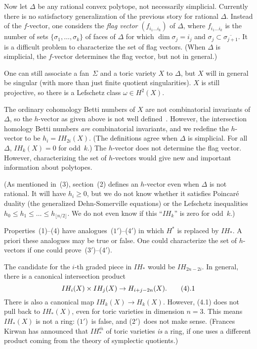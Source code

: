 Now let $\Delta$ be any rational convex polytope, not necessarily
simplicial.  Currently there is no satisfactory generalization of the
previous story for rational $\Delta$.  Instead of the $f$-vector, one
considers the {\sl flag vector\/} $(f_{i_1 \dots i_k})$ of $\Delta$,
where $f_{i_1 \dots i_k}$ is the number of sets $\{\sigma_1, \dots,
\sigma_k\}$ of faces of $\Delta$ for which $\dim \sigma_{j} = i_j$ and
$\sigma_j \subset \overline{\sigma_{j+1}}$.  It is a difficult problem
to characterize the set of flag vectors.  (When $\Delta$ is
simplicial, the $f$-vector determines the flag vector, but not in
general.)

One can still associate a fan~$\Sigma$ and a toric variety $X$ to
$\Delta$, but $X$ will in general be singular (with more than just
finite quotient singularities).  $X$ is still projective, so there is
a Lefschetz class $\omega\in H^2(X)$.

The ordinary cohomology Betti numbers of $X$ are not combinatorial
invariants of $\Delta$, so the $h$-vector as given above is not well
defined~\cite{M0}.  However, the intersection homology Betti numbers
{\sl are\/} combinatorial invariants, and we redefine the $h$-vector
to be $h_i = IH_{2i}(X)$.  (The definitions agree when $\Delta$ is
simplicial.  For all~$\Delta$, $IH_k(X) = 0$ for odd~$k$.)  The
$h$-vector does not determine the flag vector.  However,
characterizing the set of $h$-vectors would give new and important
information about polytopes.

(As mentioned in~(3), section~(2) defines an $h$-vector even when
$\Delta$ is not rational.  It will have $h_i \ge 0$, but we do not
know whether it satisfies Poincar\'e duality (the generalized
Dehn-Somerville equations) or the Lefschetz inequalities $h_0 \le h_1
\le \dots \le h_{\lfloor n/2 \rfloor}$.  We do not even know if this
``$IH_k$'' is zero for odd~$k$.)

Properties~(1)--(4) have analogues~($1'$)--($4'$) in which $H^*$ is
replaced by $IH_*$.  A priori these analogues may be true or false.
One could characterize the set of $h$-vectors if one could
prove~($3'$)--($4'$).  

The candidate for the $i$-th graded piece in $IH_*$ would be
$IH_{2n-2i}$.  In general, there is a canonical intersection product
$$
IH_i(X) \times IH_j(X) \to H_{i+j-2n}(X). \tag 4.1
$$
There is also a canonical map $IH_k(X) \to H_k(X)$.  However, (4.1)
does not pull back to $IH_*(X)$, even for toric varieties in dimension
$n=3$.  This means $IH_*(X)$ is not a
ring: ($1'$)~is false, and ($2'$)~does not make sense.  (Frances
Kirwan has announced that $IH^{\bar m}_*$ of toric varieties {\sl
is\/} a ring, if one uses a different
product coming from the theory of symplectic quotients.)

